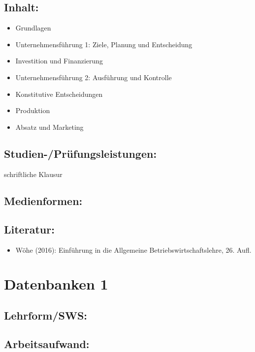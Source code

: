 \section{Inhalt:}\label{inhalt-6}

\begin{itemize}
\tightlist
\item
  Grundlagen
\item
  Unternehmensführung 1: Ziele, Planung und Entscheidung
\item
  Investition und Finanzierung
\item
  Unternehmensführung 2: Ausführung und Kontrolle
\item
  Konstitutive Entscheidungen
\item
  Produktion
\item
  Absatz und Marketing
\end{itemize}

\section{Studien-/Prüfungsleistungen:}\label{studien-pruxfcfungsleistungen-6}

schriftliche Klausur

\section{Medienformen:}\label{medienformen-6}

\section{Literatur:}\label{literatur-6}

\begin{itemize}
\tightlist
\item
  Wöhe (2016): Einführung in die Allgemeine Betriebswirtschaftslehre,
  26. Aufl.
\end{itemize}

\chapter{Datenbanken 1}\label{datenbanken-1}

\section{Lehrform/SWS:}\label{lehrformsws-7}

\section{Arbeitsaufwand:}\label{arbeitsaufwand-7}

